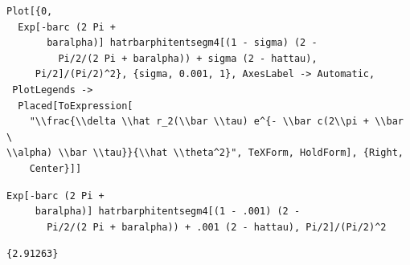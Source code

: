 \documentclass[reqno]{amsart}
\theoremstyle{definition} \newtheorem{definition}{Definition}[section]
\theoremstyle{definition} \newtheorem{remark}[definition]{Remark}
\theoremstyle{plain} \newtheorem{lemma}[definition]{Lemma}
\theoremstyle{plain} \newtheorem{proposition}[definition]{Proposition}
\theoremstyle{plain} \newtheorem{theorem}[definition]{Theorem}
\theoremstyle{plain} \newtheorem{corollary}[definition]{Corollary}
\theoremstyle{definition} \newtheorem{example}[definition]{Example}
\theoremstyle{plain} \newtheorem{claim}[clai]{Claim}
\theoremstyle{definition} \newtheorem{assumption}[definition]{Assumption}
\theoremstyle{definition} \newtheorem{observation}[definition]{Observation}
\newcommand{\1}{\mathbbm 1}
\newcommand{\sbig}{\bigskip}
\numberwithin{equation}{section} %
\theoremstyle{plain} \newtheorem*{theorem*}{Theorem}
\theoremstyle{plain} \newtheorem{mthm}[maintheorem]{Main Theorem}
\theoremstyle{plain} \newtheorem*{mthm*}{Main Theorem}
\theoremstyle{plain} \newtheorem*{conjecture*}{Conjecture}
\theoremstyle{plain} \newtheorem{conjecture}[definition]{Conjecture}
\theoremstyle{plain} \newtheorem*{problem*}{Problem}
\begin{document}
\begin{verbatim}
Plot[{0, 
  Exp[-barc (2 Pi + 
       baralpha)] hatrbarphitentsegm4[(1 - sigma) (2 - 
         Pi/2/(2 Pi + baralpha)) + sigma (2 - hattau), 
     Pi/2]/(Pi/2)^2}, {sigma, 0.001, 1}, AxesLabel -> Automatic, 
 PlotLegends -> 
  Placed[ToExpression[
    "\\frac{\\delta \\hat r_2(\\bar \\tau) e^{- \\bar c(2\\pi + \\bar \
\\alpha) \\bar \\tau}}{\\hat \\theta^2}", TeXForm, HoldForm], {Right, 
    Center}]]
\end{verbatim}
\begin{verbatim}
Exp[-barc (2 Pi + 
     baralpha)] hatrbarphitentsegm4[(1 - .001) (2 - 
       Pi/2/(2 Pi + baralpha)) + .001 (2 - hattau), Pi/2]/(Pi/2)^2
\end{verbatim}
\begin{verbatim}
{2.91263}
\end{verbatim}

\sbig


\sbig
\end{document}
